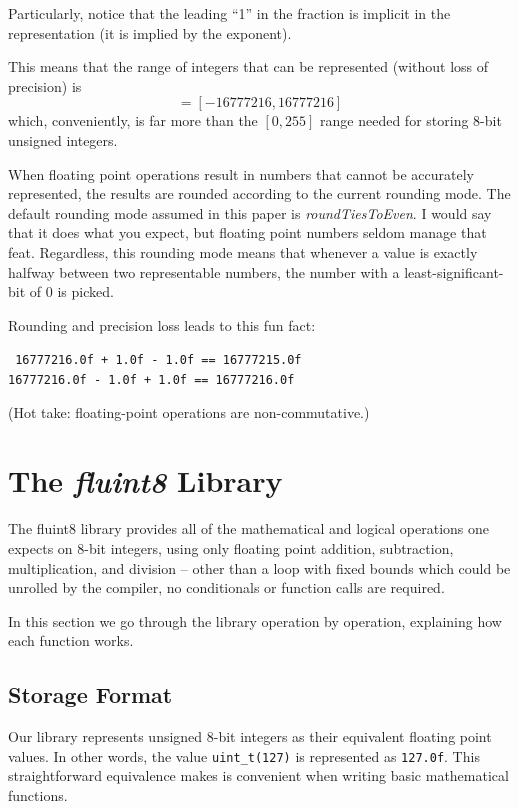 \documentclass{acmsiggraph}
\theoremstyle{remark}
\theoremstyle{definition}
\begin{document}
Particularly, notice that the leading ``1'' in the fraction is implicit in the representation (it is implied by the exponent).

This means that the range of integers that can be represented (without loss of precision) is
\begin{displaymath}
[-2^{24},2^{24}] = [-16777216, 16777216]
\end{displaymath}
which, conveniently, is far more than the $[0,255]$ range needed for storing 8-bit unsigned integers.

When floating point operations result in numbers that cannot be accurately represented, the results are rounded according to the current rounding mode.
The default rounding mode assumed in this paper is {\em roundTiesToEven}.
I would say that it does what you expect, but floating point numbers seldom manage that feat.
Regardless, this rounding mode means that whenever a value is exactly halfway between two representable numbers, the number with a least-significant-bit of 0 is picked.

Rounding and precision loss leads to this fun fact:
\begin{center} \tt
16777216.0f + 1.0f - 1.0f == 16777215.0f\\
16777216.0f - 1.0f + 1.0f == 16777216.0f
\end{center}
(Hot take: floating-point operations are non-commutative.)

\section{The {\em fluint8} Library}
The fluint8 library provides all of the mathematical and logical operations one expects on 8-bit integers, using only floating point addition, subtraction, multiplication, and division --
other than a loop with fixed bounds which could be unrolled by the compiler, no conditionals or function calls are required.

In this section we go through the library operation by operation, explaining how each function works.

\subsection{Storage Format}
Our library represents unsigned 8-bit integers as their equivalent floating point values.
In other words, the value {\tt uint\_t(127)} is represented as {\tt 127.0f}.
This straightforward equivalence makes is convenient when writing basic mathematical functions.
\end{document}
